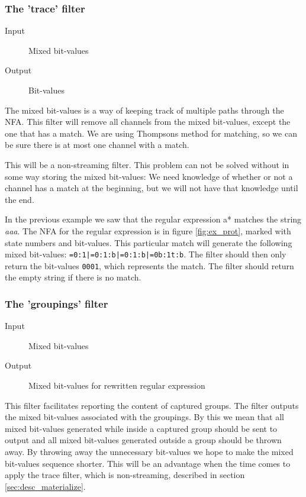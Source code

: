 \subsubsection{The 'trace' filter}
\label{sec:desc_materialize}

\begin{description}
    \item[Input] Mixed bit-values
    \item[Output] Bit-values
\end{description}

The mixed bit-values is a way of keeping track of multiple paths
through the NFA. This filter will remove all channels from the mixed
bit-values, except the one that has a match. We are using
Thompsons method for matching, so we can be sure there is at most one
channel with a match. 

This will be a non-streaming filter. This problem can not be solved
without in some way storing the mixed bit-values: We need knowledge of
whether or not a channel has a match at the beginning, but we will not
have that knowledge until the end.

\begin{example}
In the previous example we saw that the regular expression \textsf{a*}
matches the string \textsl{aaa}. The NFA for the regular expression is
in figure \vref{fig:ex_prot}, marked with state numbers and
bit-values. This particular match will generate the following mixed
bit-values: \texttt{=0:1|=0:1:b|=0:1:b|=0b:1t:b}. The filter should
then only return the bit-values \texttt{0001}, which represents the
match. The filter should return the empty string if there is no match.
\end{example}


\subsubsection{The 'groupings' filter}
\label{sec:groupings_filter_analysis}

\begin{description}
    \item[Input] Mixed bit-values
    \item[Output] Mixed bit-values for rewritten regular expression
\end{description}

This filter facilitates reporting the content of captured groups. The
filter outputs the mixed bit-values associated with the groupings. By
this we mean that all mixed bit-values generated while inside a
captured group should be sent to output and all mixed bit-values
generated outside a group should be thrown away. By throwing away the
unnecessary bit-values we hope to make the mixed bit-values sequence
shorter. This will be an advantage when the time comes to apply the
trace filter, which is non-streaming, described in section
\vref{sec:desc_materialize}.

